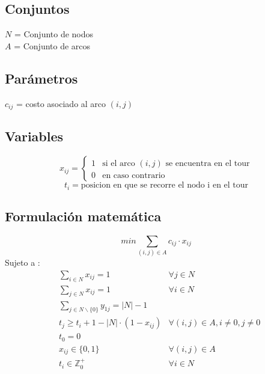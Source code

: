 \documentclass{article}
\begin{document}
\subsection{Conjuntos}
$N$ = Conjunto de nodos\\
$A$ = Conjunto de arcos
\subsection{Parámetros}
$c_{ij}$ = costo asociado al arco $(i,j)$
\subsection{Variables}
\begin{flushleft}
\[x_{ij}={\begin{cases}1&{\mbox{si el arco $(i,j)$ se encuentra en el tour}}\\0&{\mbox{en caso contrario}}\end{cases}}
\]
\[t_{i} = \mbox{posicion en que se recorre el nodo i en el tour}\]
\end{flushleft}
\subsection{Formulación matemática}
\begin{equation}
min \sum_{(i,j) \in A} c_{ij} \cdot x_{ij}
\end{equation}
Sujeto a : \begin{align}
& \sum_{i \in N} x_{ij} = 1 &\forall j \in N \\
& \sum_{j \in N} x_{ij} = 1 &\forall i \in N \\
& \sum_{j \in N \backslash \{0\}} y_{1j} = |N| - 	1 \\
& t_{j} \geq t_{i} + 1 - |N| \cdot (1 - x_{ij}) & \forall (i,j) \in A, i \neq 0, j \neq 0\\
& t_{0} = 0\\
& x_{ij} \in \{0,1\} &\forall (i,j) \in A\\
& t_{i} \in \mathbb{Z}^{+}_{0} &\forall i \in N
\end{align}
\end{document}
